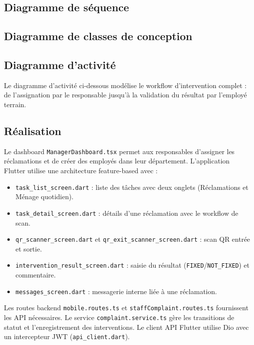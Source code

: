 \subsection{Diagramme de séquence}

\subsection{Diagramme de classes de conception}

\subsection{Diagramme d'activité}
Le diagramme d'activité ci-dessous modélise le workflow d'intervention complet : de l'assignation par le responsable jusqu'à la validation du résultat par l'employé terrain.


\subsection{Réalisation}
Le dashboard \texttt{ManagerDashboard.tsx} permet aux responsables d'assigner les réclamations et de créer des employés dans leur département. L'application Flutter utilise une architecture feature-based avec :
\begin{itemize}
\item \texttt{task\_list\_screen.dart} : liste des tâches avec deux onglets (Réclamations et Ménage quotidien).
\item \texttt{task\_detail\_screen.dart} : détails d'une réclamation avec le workflow de scan.
\item \texttt{qr\_scanner\_screen.dart} et \texttt{qr\_exit\_scanner\_screen.dart} : scan QR entrée et sortie.
\item \texttt{intervention\_result\_screen.dart} : saisie du résultat (\texttt{FIXED}/\texttt{NOT\_FIXED}) et commentaire.
\item \texttt{messages\_screen.dart} : messagerie interne liée à une réclamation.
\end{itemize}

Les routes backend \texttt{mobile.routes.ts} et \texttt{staffComplaint.routes.ts} fournissent les API nécessaires. Le service \texttt{complaint.service.ts} gère les transitions de statut et l'enregistrement des interventions. Le client API Flutter utilise Dio avec un intercepteur JWT (\texttt{api\_client.dart}).

